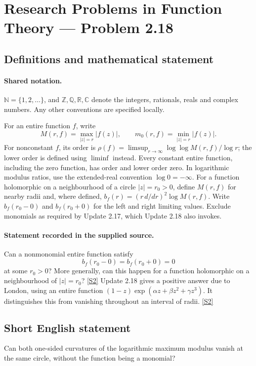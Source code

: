 \documentclass[11pt]{article}
\newcommand{\sref}[2]{\hyperlink{source:#1:#2}{[S#2]}}
\begin{document}
\section{Research Problems in Function Theory — Problem 2.18}\label{statement}

\subsection{Definitions and mathematical statement}

\paragraph{Shared notation.}$\mathbb N=\{1,2,\ldots\}$, and $\mathbb Z,\mathbb Q,\mathbb R,\mathbb C$ denote the integers, rationals, reals and complex numbers. Any other conventions are specified locally.


For an entire function $f$, write
\[
 M(r,f)=\max_{|z|=r}|f(z)|,\qquad m_0(r,f)=\min_{|z|=r}|f(z)|.
\]
For nonconstant $f$, its order is $\rho(f)=\limsup_{r\to\infty}\log\log M(r,f)/\log r$;
the lower order is defined using $\liminf$ instead. Every constant entire function, including the zero function, has order and lower order zero. In logarithmic modulus ratios, use the extended-real convention $\log0=-\infty$.
For a function holomorphic on a neighbourhood of a circle $|z|=r_0>0$, define $M(r,f)$ for nearby radii and, where defined,
$b_f(r)=(r\,d/dr)^2\log M(r,f)$. Write $b_f(r_0-0)$ and $b_f(r_0+0)$ for the left and right limiting values.
Exclude monomials as required by Update 2.17, which Update 2.18 also invokes.

\paragraph{Statement recorded in the supplied source.}
Can a nonmonomial entire function satisfy
\[b_f(r_0-0)=b_f(r_0+0)=0\]
at some $r_0>0$? More generally, can this happen for a function holomorphic on a neighbourhood of $|z|=r_0$? \sref{statement}{2}
Update 2.18 gives a positive answer due to London, using an entire function $(1-z)\exp(\alpha z+\beta z^2+\gamma z^3)$. It distinguishes this from vanishing throughout an interval of radii. \sref{statement}{2}
\subsection{Short English statement}
Can both one-sided curvatures of the logarithmic maximum modulus vanish at the same circle, without the function being a monomial?
\end{document}
